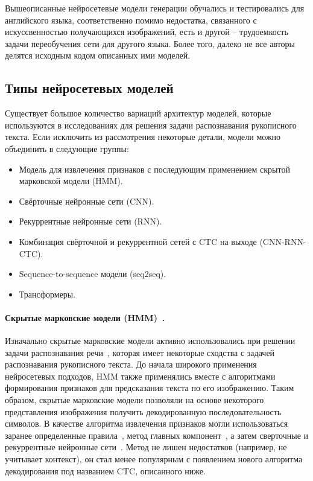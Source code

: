 Вышеописанные нейросетевые модели генерации обучались и тестировались для английского языка, соответственно помимо недостатка,
связанного с искуссвенностью получающихся изображений, есть и другой -- трудоемкость задачи переобучения сети для другого языка.
Более того, далеко не все авторы делятся исходным кодом описанных ими моделей.


\subsection{Типы нейросетевых моделей}
\label{subsec:networks-description}

Существует большое количество вариаций архитектур моделей, которые используются в исследованиях для решения задачи распознавания рукописного текста.
Если исключить из рассмотрения некоторые детали, модели можно объединить в следующие группы:
\begin{itemize}
    \item Модель для извлечения признаков с последующим применением скрытой марковской модели (HMM).
    \item Свёрточные нейронные сети (CNN).
    \item Рекуррентные нейронные сети (RNN).
    \item Комбинация свёрточной и рекуррентной сетей с CTC на выходе (CNN-RNN-CTC).
    \item Sequence-to-sequence модели (seq2seq).
    \item Трансформеры.
\end{itemize}

\paragraph{Скрытые марковские модели (HMM)~\cite{rabiner1986introduction}.}{
    Изначально скрытые марковские модели активно использовались при решении задачи распознавания речи~\cite{trentin2001survey},
    которая имеет некоторые сходства с задачей распознавания рукописного текста.
    До начала широкого применения нейросетевых подходов, HMM также применялись вместе с алгоритмами формирования признаков для предсказания текста по его изображению.
    Таким образом, скрытые марковские модели позволяли на основе некоторого представления изображения получить декодированную последовательность символов.
    В качестве алгоритма извлечения признаков могли использоваться заранее определенные правила~\cite{bertolami2008hidden},
    метод главных компонент~\cite{dreuw2011confidence}, а затем сверточные и рекуррентные нейронные сети~\cite{bluche2013tandem, bluche2014comparison}.
    Метод не лишен недостатков (например, не учитывает контекст), он стал менее популярным с появлением нового алгоритма декодирования под названием CTC, описанного ниже.
}

